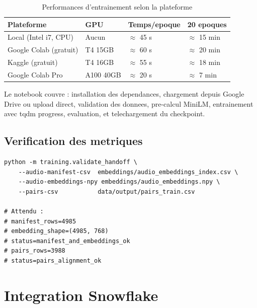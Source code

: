 \documentclass[12pt, a4paper]{article}
\begin{document}
\begin{table}[H]
\centering
\caption{Performances d'entrainement selon la plateforme}
\begin{tabular}{llll}
\toprule
\textbf{Plateforme} & \textbf{GPU} & \textbf{Temps/epoque} & \textbf{20 epoques} \\
\midrule
Local (Intel i7, CPU) & Aucun    & $\approx$ 45 s & $\approx$ 15 min \\
\rowcolor{silver}
Google Colab (gratuit) & T4 15GB & $\approx$ 60 s & $\approx$ 20 min \\
Kaggle (gratuit)       & T4 16GB & $\approx$ 55 s & $\approx$ 18 min \\
\rowcolor{silver}
Google Colab Pro       & A100 40GB & $\approx$ 20 s & $\approx$ 7 min \\
\bottomrule
\end{tabular}
\end{table}

Le notebook couvre : installation des dependances, chargement depuis Google Drive
ou upload direct, validation des donnees, pre-calcul MiniLM, entrainement avec
tqdm progress, evaluation, et telechargement du checkpoint.

\subsection{Verification des metriques}

\begin{lstlisting}[caption={Validation des donnees P1/P2 (training/validate\_handoff.py)}]
python -m training.validate_handoff \
    --audio-manifest-csv  embeddings/audio_embeddings_index.csv \
    --audio-embeddings-npy embeddings/audio_embeddings.npy \
    --pairs-csv           data/output/pairs_train.csv

# Attendu :
# manifest_rows=4985
# embedding_shape=(4985, 768)
# status=manifest_and_embeddings_ok
# pairs_rows=3988
# status=pairs_alignment_ok
\end{lstlisting}

\newpage

\section{Integration Snowflake}
\end{document}

